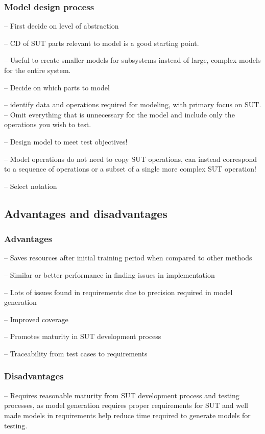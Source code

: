 \subsubsection{Model design process}
-- First decide on level of abstraction

-- CD of SUT parts relevant to model is a good starting point.

-- Useful to create smaller models for subsystems instead of large, complex models for the entire system. 

-- Decide on which parts to model

-- identify data and operations required for modeling, with primary focus on SUT.
	-- Omit everything that is unnecessary for the model and include only the operations you wish to test.
	
-- Design model to meet test objectives!

-- Model operations do not need to copy SUT operations, can instead correspond to a sequence of operations or a subset of a single more complex SUT operation!

-- Select notation

\subsection{Advantages and disadvantages}

\subsubsection{Advantages}
-- Saves resources after initial training period when compared to other methods

-- Similar or better performance in finding issues in implementation

-- Lots of issues found in requirements due to precision required in model generation

-- Improved coverage

-- Promotes maturity in SUT development process

-- Traceability from test cases to requirements

\subsubsection{Disadvantages}
-- Requires reasonable maturity from SUT development process and testing processes, as model generation requires proper requirements for SUT and well made models in requirements help reduce time required to generate models for testing.

